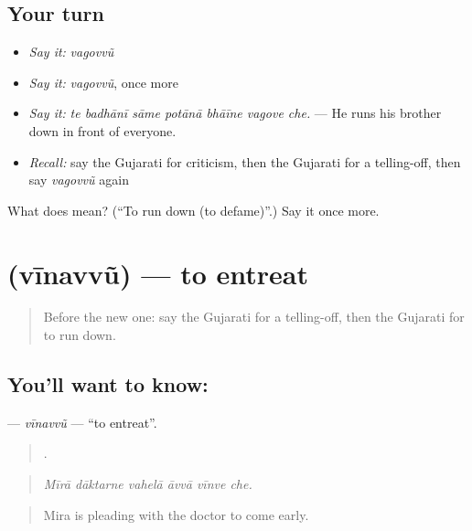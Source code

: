 \subsection*{Your turn}
\begin{itemize}
\raggedright
  \item \emph{Say it:} \emph{vagovvũ}
  \item \emph{Say it:} \emph{vagovvũ}, once more
  \item \emph{Say it:} \emph{te badhānī sāme potānā bhāīne vagove che.} — He runs his brother down in front of everyone.
  \item \emph{Recall:} say the Gujarati for criticism, then the Gujarati for a telling-off, then say \emph{vagovvũ} again
\end{itemize}

\begin{tcolorbox}[breakable,colback=teal!4,colframe=teal!35!black,title={Before you move on}]
What does  mean? (\textquotedblleft{}To run down (to defame)\textquotedblright{}.) Say it once more.
\end{tcolorbox}
\section[\texorpdfstring{\gu{વીનવવું} (vīnavvũ)}{વીનવવું (vīnavvũ)}]{ (vīnavvũ) — to entreat}

\label{lesson:GU-C361-vinavvu}



\begin{quote}
Before the new one: say the Gujarati for a telling-off, then the Gujarati for to run down.
\end{quote}

\subsection*{You'll want to know: }
\textbf{} — \emph{vīnavvũ} — \textquotedblleft{}to entreat\textquotedblright{}.

\begin{quote}
     .
\end{quote}

\begin{quote}
\emph{Mīrā dāktarne vahelā āvvā vīnve che.}
\end{quote}

\begin{quote}
Mira is pleading with the doctor to come early.
\end{quote}

